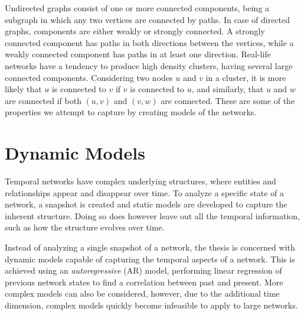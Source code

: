     Undirected graphs consist of one or more connected components, being a subgraph in which any two vertices are connected by paths. 
    In case of directed graphs, components are either weakly or strongly connected. A strongly connected component has paths in both directions between the vertices, while a weakly connected component has paths in at least one direction. 
    Real-life networks have a tendency to produce high density clusters, having several large connected components. 
    Considering two nodes $u$ and $v$ in a cluster, it is more likely that $u$ is connected to $v$ if $v$ is connected to $u$, and similarly, that $u$ and $w$ are connected if both $(u,v)$ and $(v,w)$ are connected. These are some of the properties we attempt to capture by creating models of the networks.

\section{Dynamic Models}

    Temporal networks have complex underlying structures, where entities and relationships appear and disappear over time. To analyze a specific state of a network, a snapshot is created and static models are developed to capture the inherent structure.
    Doing so does however leave out all the temporal information, such as how the structure evolves over time.
    
    Instead of analyzing a single snapshot of a network, the thesis is concerned with dynamic models capable of capturing the temporal aspects of a network. This is achieved using an \emph{autoregressive} (AR) model, performing linear regression of previous network states to find a correlation between past and present. More complex models can also be considered, however, due to the additional time dimension, complex models quickly become infeasible to apply to large networks.
    
